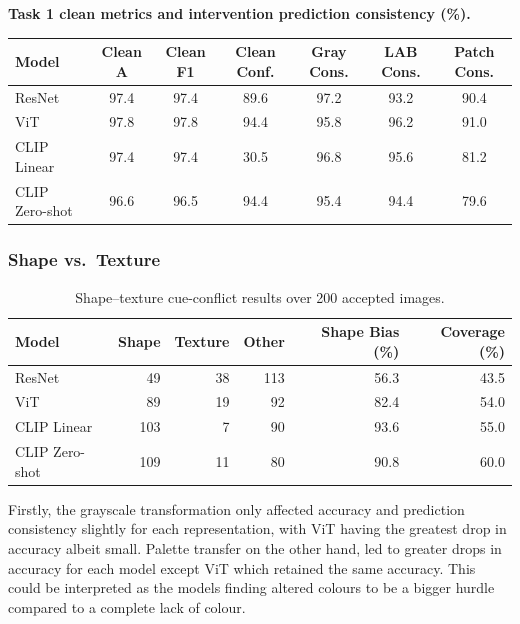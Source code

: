 \documentclass{article}
\begin{document}
\begin{table}[t]
    \centering
    \scriptsize
    \setlength{\tabcolsep}{4pt}
    \textbf{Task 1 clean metrics and intervention prediction consistency (\%).}\\[0.2em]
    \begin{tabular}{lcccccc}
        \toprule
        Model & Clean A & Clean F1 & Clean Conf. & Gray Cons. & LAB Cons. & Patch Cons. \\
        \midrule
        ResNet         & 97.4 & 97.4 & 89.6 & 97.2 & 93.2 & 90.4 \\
        ViT            & 97.8 & 97.8 & 94.4 & 95.8 & 96.2 & 91.0 \\
        CLIP Linear    & 97.4 & 97.4 & 30.5 & 96.8 & 95.6 & 81.2 \\
        CLIP Zero-shot & 96.6 & 96.5 & 94.4 & 95.4 & 94.4 & 79.6 \\
        \bottomrule
    \end{tabular}
\end{table}


\subsubsection{Shape vs.\ Texture}
\label{subsubsec:results-t1-shape-texture}


\begin{table}[t]
    \centering
    \caption{Shape--texture cue-conflict results over 200 accepted images.}
    \label{tab:shape_texture}
    \small
    \begin{tabular}{lrrrrr}
        \toprule
        Model & Shape & Texture & Other & Shape Bias (\%) & Coverage (\%) \\
        \midrule
        ResNet         & 49  & 38 & 113 & 56.3 & 43.5 \\
        ViT            & 89  & 19 & 92  & 82.4 & 54.0 \\
        CLIP Linear    & 103 & 7  & 90  & 93.6 & 55.0 \\
        CLIP Zero-shot & 109 & 11 & 80  & 90.8 & 60.0 \\
        \bottomrule
    \end{tabular}
\end{table}

Firstly, the grayscale transformation only affected accuracy and prediction consistency slightly for each representation, with ViT having the greatest drop in accuracy albeit small. Palette transfer on the other hand, led to greater drops in accuracy for each model except ViT which retained the same accuracy. This could be interpreted as the models finding altered colours to be a bigger hurdle compared to a complete lack of colour. 
\end{document}
